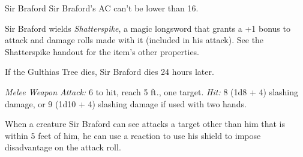 \documentclass[10pt,a4paper,twoside,bg=print,twocolumn,openany,nodeprecatedcode]{dndbook}
\begin{document}
\begin{DndMonster}[float=t]{Sir Braford}
\DndMonsterBasics[
armor-class = {18 (\textit{chain mail})},
hit-points = {\DndDice{3d8 + 6}},
speed = {30 ft.}
]
\DndMonsterAbilityScores[
 str = 16,
 dex = 9,
 con = 14,
 int = 10,
 wis = 13,
 cha = 14
]
\DndMonsterDetails[
skills = {Athletics +5, Perception +3},
languages = {Common},
challenge = 1/2,
]
Sir Braford's AC can't be lower than 16.

Sir Braford wields \textit{Shatterspike}, a magic longsword that grants a +1 bonus to attack and damage rolls made with it (included in his attack). See the Shatterspike handout for the item's other properties.

If the Gulthias Tree dies, Sir Braford dies 24 hours later.

\textsl{Melee Weapon Attack:} 6 to hit, reach 5 ft., one target. \textsl{Hit:} 8 (1d8 + 4) slashing damage, or 9 (1d10 + 4) slashing damage if used with two hands.

When a creature Sir Braford can see attacks a target other than him that is within 5 feet of him, he can use a reaction to use his shield to impose disadvantage on the attack roll.

\end{DndMonster}
\end{document}
